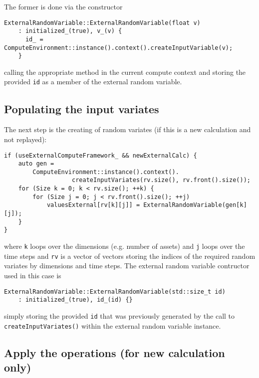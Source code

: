 \documentclass[12pt, a4paper]{article}
\begin{document}
The former is done via the constructor

\begin{verbatim}
ExternalRandomVariable::ExternalRandomVariable(float v)
    : initialized_(true), v_(v) {
      id_ = ComputeEnvironment::instance().context().createInputVariable(v);
    }
\end{verbatim}

calling the appropriate method in the current compute context and storing the provided \verb+id+ as a member of the
external random variable.

\subsection{Populating the input variates}

The next step is the creating of random variates (if this is a new calculation and not replayed):

\begin{verbatim}
if (useExternalComputeFramework_ && newExternalCalc) {
    auto gen =
        ComputeEnvironment::instance().context().
                   createInputVariates(rv.size(), rv.front().size());
    for (Size k = 0; k < rv.size(); ++k) {
        for (Size j = 0; j < rv.front().size(); ++j)
            valuesExternal[rv[k][j]] = ExternalRandomVariable(gen[k][j]);
    }
}
\end{verbatim}

where \verb+k+ loops over the dimensions (e.g. number of assets) and \verb+j+ loops over the time steps and \verb+rv+ is
a vector of vectors storing the indices of the required random variates by dimensions and time steps. The external
random variable contructor used in this case is

\begin{verbatim}
ExternalRandomVariable::ExternalRandomVariable(std::size_t id)
    : initialized_(true), id_(id) {}
\end{verbatim}

simply storing the provided \verb+id+ that was previously generated by the call to \verb+createInputVariates()+ within
the external random variable instance.

\subsection{Apply the operations (for new calculation only)}
\end{document}
